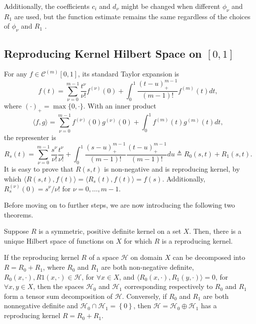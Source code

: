 Additionally, the coefficients $c_i$ and $d_\nu$ might be changed when different $\phi_\nu$ and $R_1$ are used, but the function estimate remains the same regardless of the choices of $\phi_\nu$ and $R_1$ \citep{gu2013smoothing}.


\subsection{Reproducing Kernel Hilbert Space on $[0,1]$}

For any $f\in \mathcal{C}^{(m)}[0,1]$, its standard Taylor expansion is  
\begin{equation}
f(t) = \sum_{\nu=0}^{m-1}\frac{t^\nu}{\nu!}f^{(\nu)}(0) + \int_{0}^{1}\frac{(t-u)_+^{m-1}}{(m-1)!}f^{(m)}(t)dt,
\end{equation}
where $(\cdot)_+ =\max\lbrace 0, \cdot\rbrace$. With an inner product 
\begin{equation}
\langle f,g \rangle = \sum_{\nu=0}^{m-1}f^{(\nu)}(0)g^{(\nu)}(0) +  \int_{0}^{1}f^{(m)}(t) g^{(m)}(t)dt,
\end{equation}
the representer is 
\begin{equation}\label{GaussianProcessKernelR}
R_s(t) =\sum_{\nu=0}^{m-1} \frac{s^{\nu}}{\nu!} \frac{t^{\nu}}{\nu!} +\int_0^1\frac{ (s-u)_+^{m-1}}{(m-1)!} \frac{ (t-u)_+^{m-1}}{(m-1)!} du \triangleq R_0(s,t)+R_1(s,t). 
\end{equation}
It is easy to prove that $R(s,t)$ is non-negative and is reproducing kernel, by which $\langle R(s,t),f(t) \rangle = \langle R_s(t),f(t) \rangle=f(s)$. Additionally, $R_s^{(\nu)}(0) = s^\nu/\nu!$ for $\nu = 0,\ldots, m-1$.

Before moving on to further steps, we are now introducing the following two theorems. 
\begin{theorem}\citep{aronszajn1950theory}\label{theoremRKHS}
Suppose $R$ is a symmetric, positive definite kernel on a set $X$. Then, there is a unique Hilbert space of functions on $X$ for which $R$ is a reproducing kernel. 
\end{theorem}
\begin{theorem}\citep{gu2013smoothing}\label{theoremKernel}
If the reproducing kernel $R$ of a space $\mathcal{H}$ on domain $X$ can
be decomposed into $R = R_0 + R_1$, where $R_0$ and $R_1$ are both non-negative definite, $R_0(x, \cdot),R1(x,\cdot) \in \mathcal{H}$, for $ \forall x \in X$, and $\langle R_0(x, \cdot),R_1(y, \cdot) \rangle= 0$, for $\forall x, y \in X$, then the spaces $\mathcal{H}_0$ and $\mathcal{H}_1$ corresponding respectively to $R_0$ and $R_1$ form a tensor sum decomposition of $\mathcal{H}$. Conversely, if $R_0$ and $R_1$ are both  nonnegative definite and $\mathcal{H}_0 \cap \mathcal{H}_1 =\left\lbrace 0\right\rbrace$, then $\mathcal{H} =\mathcal{H}_0 \oplus \mathcal{H}_1$ has a reproducing kernel $R = R_0 + R_1$.
\end{theorem}

